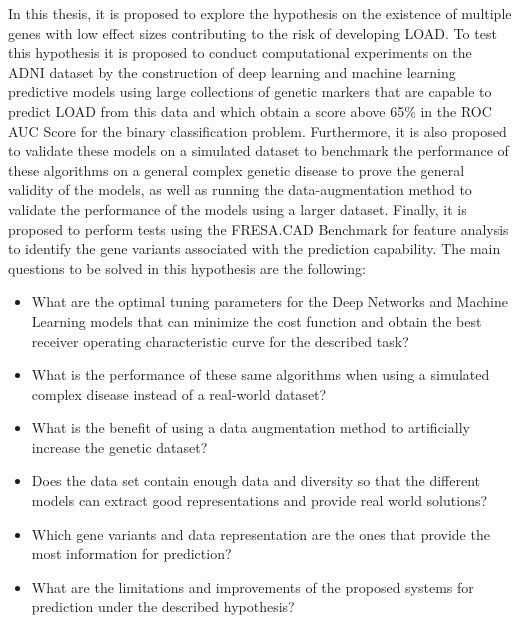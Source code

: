 In this thesis, it is proposed to explore the hypothesis on the existence of multiple genes with low effect sizes contributing to the risk of developing LOAD. To test this hypothesis it is proposed to conduct computational experiments on the ADNI dataset by the construction of deep learning and machine learning predictive models using large collections of genetic markers that are capable to predict LOAD from this data and which obtain a score above 65\% in the ROC AUC Score for the binary classification problem. Furthermore, it is also proposed to validate these models on a simulated dataset to benchmark the performance of these algorithms on a general complex genetic disease to prove the general validity of the models, as well as running the data-augmentation method to validate the performance of the models using a larger dataset. Finally, it is proposed to perform tests using the FRESA.CAD Benchmark for feature analysis to identify the gene variants associated with the prediction capability.  
\newpage
The main questions to be solved in this hypothesis are the following:
\begin{itemize}

\item What are the optimal tuning parameters for the Deep Networks and Machine Learning models that can minimize the cost function and obtain the best receiver operating characteristic curve for the described task?

\item What is the performance of these same algorithms when using a simulated complex disease instead of a real-world dataset?

\item What is the benefit of using a data augmentation method to artificially increase the genetic dataset?

\item Does the data set contain enough data and diversity so that the different models can extract good representations and provide real world solutions?

\item Which gene variants and data representation are the ones that provide the most information for prediction?
\item What are the limitations and improvements of the proposed systems for prediction under the described hypothesis?

\end{itemize}

